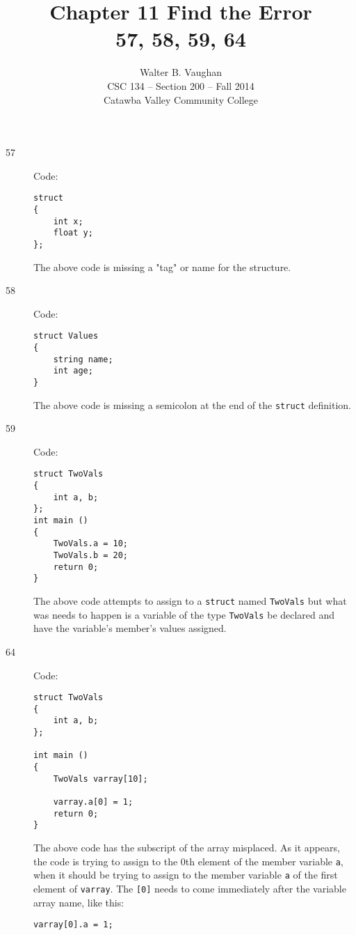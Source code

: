 \documentclass[11pt]{article}
\author{Walter B. Vaughan\\
        \small CSC 134 -- Section 200 -- Fall 2014\\
        \small Catawba Valley Community College}
\title{Chapter 11 Find the Error \\
       \footnotesize{57, 58, 59, 64}}
\date{\vspace{-5ex}}
\begin{document}
\maketitle

\begin{description}
    \item[57] Code:
    \begin{lstlisting}
struct
{
    int x;
    float y;
};
\end{lstlisting}
    The above code is missing a "tag" or name for the structure.

    \item[58] Code:
    \begin{lstlisting}
struct Values
{
    string name;
    int age;
}
\end{lstlisting}
    The above code is missing a semicolon at the end of the \lstinline{struct} definition.

    \item[59] Code:
    \begin{lstlisting}
struct TwoVals
{
    int a, b;
};
int main ()
{
    TwoVals.a = 10;
    TwoVals.b = 20;
    return 0;
}
\end{lstlisting}
    The above code attempts to assign to a \lstinline{struct} named \lstinline{TwoVals} but what was needs to happen is a variable of the type \lstinline{TwoVals} be declared and have the variable's member's values assigned.


\newpage %

    \item[64] Code:
    \begin{lstlisting}
struct TwoVals
{
    int a, b;
};

int main ()
{
    TwoVals varray[10];

    varray.a[0] = 1;
    return 0;
}
\end{lstlisting}
    The above code has the subscript of the array misplaced. As it appears, the code is trying to assign to the 0th element of the member variable \lstinline{a}, when it should be trying to assign to the member variable \lstinline{a} of the first element of \lstinline{varray}. The \lstinline{[0]} needs to come immediately after the variable array name, like this: \begin{lstlisting}[firstnumber=8]
    varray[0].a = 1;
\end{lstlisting}
\end{description}
\end{document}
